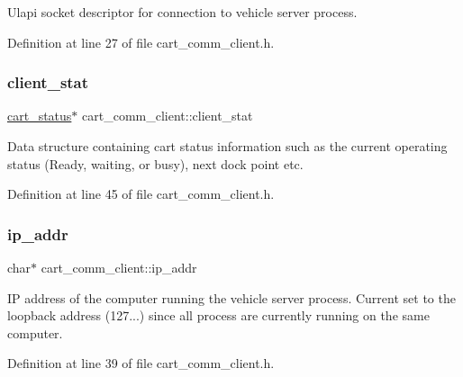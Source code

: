 Ulapi socket descriptor for connection to vehicle server process. 

Definition at line 27 of file cart\+\_\+comm\+\_\+client.\+h.

\mbox{\label{classcart__comm__client_abaecd6fff514a7e5897f45ec7c9815c9}} 
\subsubsection{\texorpdfstring{client\+\_\+stat}{client\_stat}}
{\footnotesize\ttfamily \mbox{\hyperlink{classcart__status}{cart\+\_\+status}}$\ast$ cart\+\_\+comm\+\_\+client\+::client\+\_\+stat\hspace{0.3cm}{\ttfamily [private]}}

Data structure containing cart status information such as the current operating status (Ready, waiting, or busy), next dock point etc. 

Definition at line 45 of file cart\+\_\+comm\+\_\+client.\+h.

\mbox{\label{classcart__comm__client_a4be5bd4f9f71038a43ec454d8370583a}} 
\subsubsection{\texorpdfstring{ip\+\_\+addr}{ip\_addr}}
{\footnotesize\ttfamily char$\ast$ cart\+\_\+comm\+\_\+client\+::ip\+\_\+addr\hspace{0.3cm}{\ttfamily [private]}}

IP address of the computer running the vehicle server process. Current set to the loopback address (127...) since all process are currently running on the same computer. 

Definition at line 39 of file cart\+\_\+comm\+\_\+client.\+h.

\mbox{\label{classcart__comm__client_a7829aa94a950b37a2d003f11761e269d}} 
